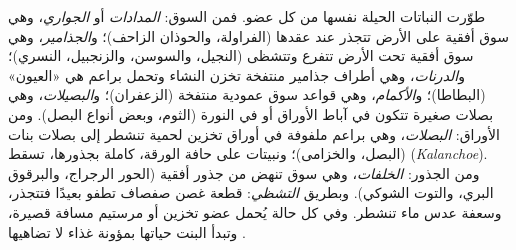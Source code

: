 \begin{proposition}\label{prop:b2:asexual-reproduction:organs}
طوّرت النباتات الحيلة نفسها من كل عضو. فمن السوق: \emph{المدادات}
أو \emph{الجواري}، وهي سوق أفقية على الأرض تتجذر عند عقدها
(الفراولة، والحوذان الزاحف)؛ و\emph{الجذامير}، وهي سوق أفقية تحت
الأرض تتفرع وتتشظى (النجيل، والسوسن، والزنجبيل،  النسري)؛
و\emph{الدرنات}، وهي أطراف جذامير منتفخة تخزن النشاء وتحمل براعم هي
«العيون» (البطاطا)؛ و\emph{الأكمام}، وهي قواعد سوق عمودية منتفخة
(الزعفران)؛ و\emph{البصيلات}، وهي بصلات صغيرة تتكون في آباط الأوراق
أو في النورة (الثوم، وبعض أنواع البصل). ومن الأوراق: \emph{البصلات}،
وهي براعم ملفوفة في أوراق تخزين لحمية تنشطر إلى بصلات بنات
(البصل، والخزامى)؛ ونبيتات على حافة الورقة، كاملة بجذورها، تسقط
(\emph{Kalanchoe}). ومن الجذور: \emph{الخلفات}، وهي سوق تنهض من
جذور أفقية (الحور الرجراج، والبرقوق البري، والتوت الشوكي). وبطريق
\emph{التشظي}: قطعة غصن صفصاف تطفو بعيدًا فتتجذر، وسعفة عدس ماء
تنشطر. وفي كل حالة يُحمل عضو تخزين أو مرستيم مسافة قصيرة، وتبدأ
البنت حياتها بمؤونة غذاء لا تضاهيها .
\end{proposition}

